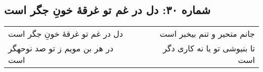 \begin{center}
\section*{شماره ۳۰: دل در غم تو غرقۀ خونِ جگر است}
\label{sec:030}
\begin{longtable}{l p{0.5cm} r}
دل در غم تو غرقهٔ خونِ جگر است
&&
جانم متحیر و تنم بیخبر است
\\
در هر بن مویم ز تو صد نوحهگر است
&&
تا بنیوشی تو یا نه کاری دگر است
\\
\end{longtable}
\end{center}
